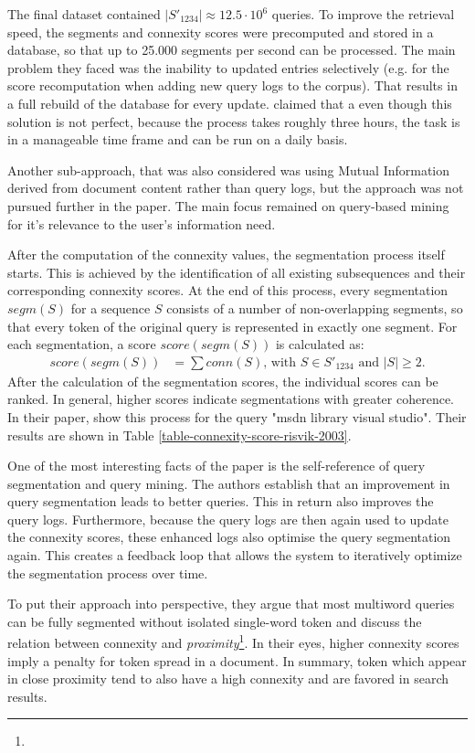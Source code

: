 The final dataset contained $|S'_{1234}| \approx 12.5 \cdot 10^6$ queries. 
To improve the retrieval speed, the segments and connexity scores were precomputed and stored in a database, so that up to 25.000 segments per second can be processed. The main problem they faced was the inability to updated entries selectively (e.g. for the score recomputation when adding new query logs to the corpus). That results in a full rebuild of the database for every update. \citeauthor{Risvik:2003} claimed that a even though this solution is not perfect, because the process takes roughly three hours, the task is in a manageable time frame and can be run on a daily basis.

Another sub-approach, that was also considered was using Mutual Information derived from document content rather than query logs, but the approach was not pursued further in the paper. The main focus remained on query-based mining for it's relevance to the user's information need.

After the computation of the connexity values, the segmentation process itself starts. This is achieved by the identification of all existing subsequences and their corresponding connexity scores. At the end of this process, every segmentation $segm(S)$ for a sequence $S$ consists of a number of non-overlapping segments, so that every token of the original query is represented in exactly one segment. For each segmentation, a score $score(segm(S))$ is calculated as:
\begin{align*}
score(segm(S)) &= \sum conn(S) \text{, with } S \in S'_{1234} \text{ and } |S| \ge 2.
\end{align*}
After the calculation of the segmentation scores, the individual scores can be ranked. In general, higher scores indicate segmentations with greater coherence. In their paper, \citeauthor{Risvik:2003} show this process for the query "msdn library visual studio". Their results are shown in Table \ref{table-connexity-score-risvik-2003}.




One of the most interesting facts of the paper is the self-reference of 
query segmentation and query mining. The authors establish that an improvement in query segmentation leads to better queries. This in return also improves the query logs. Furthermore, because the query logs are then again used to update the connexity scores, these enhanced logs also optimise the query segmentation again. This creates a feedback loop that allows the system to iteratively optimize the segmentation process over time.

To put their approach into perspective, they 	argue that most multiword queries can be fully segmented without isolated single-word token and discuss the relation between connexity and \textit{proximity}\footnote{}. In their eyes, higher connexity scores imply a penalty for token spread in a document. In summary, token which appear in close proximity tend to also have a high connexity and are favored in search results.